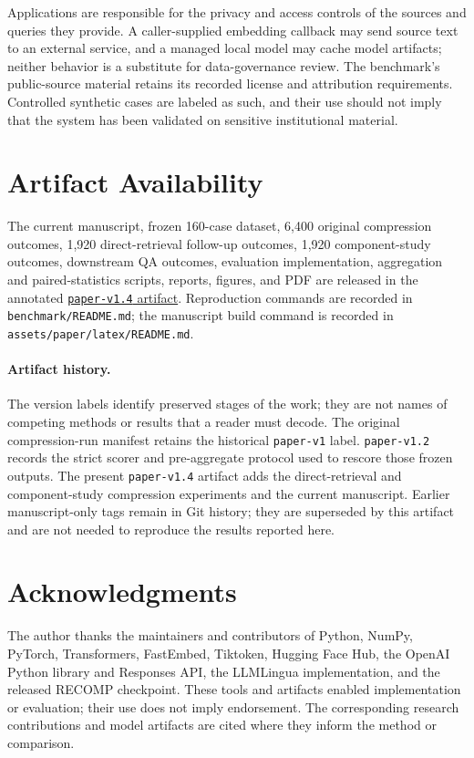 \documentclass[
]{article}
\begin{document}
Applications are responsible for the privacy and access controls of the
sources and queries they provide. A caller-supplied embedding callback
may send source text to an external service, and a managed local model
may cache model artifacts; neither behavior is a substitute for
data-governance review. The benchmark's public-source material retains
its recorded license and attribution requirements. Controlled synthetic
cases are labeled as such, and their use should not imply that the
system has been validated on sensitive institutional material.

\section{Artifact Availability}\label{artifact-availability}

The current manuscript, frozen 160-case dataset, 6,400 original compression
outcomes, 1,920 direct-retrieval follow-up outcomes, 1,920 component-study
outcomes, downstream QA outcomes,
evaluation implementation,
aggregation and paired-statistics scripts, reports, figures, and PDF are
released in the annotated
\href{https://github.com/tenwritehq/trimwise/tree/paper-v1.4}{\texttt{paper-v1.4}
artifact}. Reproduction commands are recorded in \texttt{benchmark/README.md};
the manuscript build command is recorded in \texttt{assets/paper/latex/README.md}.

\paragraph{Artifact history.} The version labels identify preserved stages of
the work; they are not names of competing methods or results that a reader must
decode. The original compression-run manifest retains the historical
\texttt{paper-v1} label. \texttt{paper-v1.2} records the strict scorer and
pre-aggregate protocol used to rescore those frozen outputs. The present
\texttt{paper-v1.4} artifact adds the direct-retrieval and component-study
compression experiments and the current manuscript. Earlier manuscript-only tags remain in Git history;
they are superseded by this artifact and are not needed to reproduce the
results reported here.

\section{Acknowledgments}\label{acknowledgments}

The author thanks the maintainers and contributors of Python, NumPy, PyTorch,
Transformers, FastEmbed, Tiktoken, Hugging Face Hub, the OpenAI Python library
and Responses API, the LLMLingua implementation, and the released RECOMP
checkpoint. These tools and artifacts enabled implementation or evaluation;
their use does not imply endorsement. The corresponding research contributions
and model artifacts are cited where they inform the method or comparison.
\end{document}

